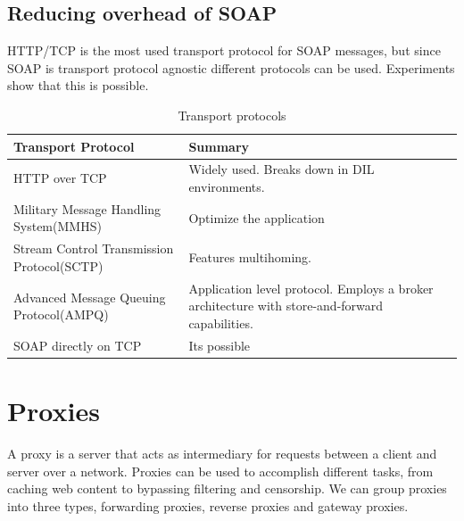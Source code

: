 \documentclass[USenglish]{ifimaster}
\begin{document}
\subsection{Reducing overhead of SOAP}
HTTP/TCP is the most used transport protocol for SOAP messages, but since SOAP is transport protocol agnostic different protocols can be used. Experiments show that this is possible.


\begin{table}[h]
\begin{tabularx}{\textwidth}{| X | X |}
\hline
  \textbf{Transport Protocol} & \textbf{Summary} \\ \hline
  HTTP over TCP & Widely used. Breaks down in DIL environments.\\ \hline
  Military Message Handling System(MMHS) & Optimize the application\\ \hline
  Stream Control Transmission Protocol(SCTP) & Features multihoming. \\ \hline
  Advanced Message Queuing Protocol(AMPQ) & Application level protocol. Employs
  a broker architecture with store-and-forward capabilities. \\ \hline
  SOAP directly on TCP & Its possible \\ \hline
\end{tabularx}
\caption{Transport protocols}
\end{table}

\section{Proxies}
A proxy is a server that acts as intermediary for requests between a client and
server over a network. Proxies can be used to accomplish different tasks, from
caching web content to bypassing filtering and censorship. We can group proxies
into three types, forwarding proxies, reverse proxies and gateway proxies.
\end{document}
